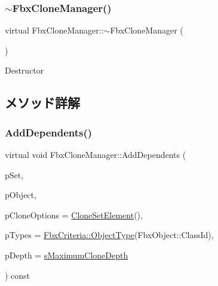 \subsubsection{\texorpdfstring{$\sim$\+Fbx\+Clone\+Manager()}{~FbxCloneManager()}}
{\footnotesize\ttfamily virtual Fbx\+Clone\+Manager\+::$\sim$\+Fbx\+Clone\+Manager (\begin{DoxyParamCaption}{ }\end{DoxyParamCaption})\hspace{0.3cm}{\ttfamily [virtual]}}

Destructor 

\subsection{メソッド詳解}
\mbox{\label{class_fbx_clone_manager_a3a7786f536d8f61f0b84f114e6e870d2}} 
\subsubsection{\texorpdfstring{Add\+Dependents()}{AddDependents()}}
{\footnotesize\ttfamily virtual void Fbx\+Clone\+Manager\+::\+Add\+Dependents (\begin{DoxyParamCaption}\item[{\hyperlink{class_fbx_clone_manager_aeb8a9c04c9c36eb7e551186a0b18f10d}{Clone\+Set} \&}]{p\+Set,  }\item[{const \hyperlink{class_fbx_object}{Fbx\+Object} $\ast$}]{p\+Object,  }\item[{const \hyperlink{struct_fbx_clone_manager_1_1_clone_set_element}{Clone\+Set\+Element} \&}]{p\+Clone\+Options = {\ttfamily \hyperlink{struct_fbx_clone_manager_1_1_clone_set_element}{Clone\+Set\+Element}()},  }\item[{\hyperlink{class_fbx_criteria}{Fbx\+Criteria}}]{p\+Types = {\ttfamily \hyperlink{class_fbx_criteria_a760d66022a8febcd3fd0c5fbbb534023}{Fbx\+Criteria\+::\+Object\+Type}(FbxObject\+:\+:ClassId)},  }\item[{int}]{p\+Depth = {\ttfamily \hyperlink{class_fbx_clone_manager_a1844e81f1b96760b4223024b4c133da7}{s\+Maximum\+Clone\+Depth}} }\end{DoxyParamCaption}) const\hspace{0.3cm}{\ttfamily [virtual]}}

